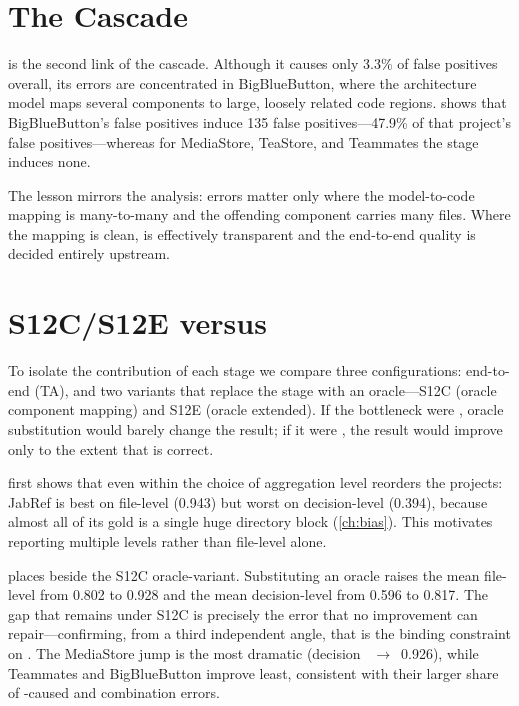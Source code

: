 \section{The \samcode Cascade}
\label{sec:transarc:samcode}

\samcode is the second link of the cascade. Although it causes only 3.3\% of
\transarc false positives overall, its errors are concentrated in
BigBlueButton, where the architecture model maps several components to large,
loosely related code regions.  shows that
BigBlueButton's \samcode false positives induce 135 \sadcode false
positives---47.9\% of that project's \transarc false positives---whereas for
MediaStore, TeaStore, and Teammates the \samcode stage induces none.



The lesson mirrors the \sadsam analysis: \samcode errors matter only where the
model-to-code mapping is many-to-many and the offending component carries many
files. Where the mapping is clean, \samcode is effectively transparent and the
end-to-end quality is decided entirely upstream.

\section{S12C/S12E versus \transarc}
\label{sec:transarc:s12c}

To isolate the contribution of each stage we compare three configurations:
end-to-end \transarc (TA), and two variants that replace the \samcode stage with
an oracle---S12C (oracle \samcode component mapping) and S12E (oracle \samcode
extended). If the bottleneck were \samcode, oracle substitution would barely
change the result; if it were \sadsam, the result would improve only to the
extent that \sadsam is correct.

 first shows that even within \transarc the choice of
aggregation level reorders the projects: JabRef is best on file-level \fone
(0.943) but worst on decision-level \fone (0.394), because almost all of its
gold is a single huge directory block (\cref{ch:bias}). This motivates reporting
multiple levels rather than file-level \fone alone.



 places \transarc beside the S12C oracle-\samcode variant.
Substituting an oracle \samcode raises the mean file-level \fone from 0.802 to
0.928 and the mean decision-level \fone from 0.596 to 0.817. The gap that
remains under S12C is precisely the \sadsam error that no \samcode improvement
can repair---confirming, from a third independent angle, that \sadsam is the
binding constraint on \transarc. The MediaStore jump is the most dramatic
(decision ~$\to$~0.926), while Teammates and BigBlueButton improve
least, consistent with their larger share of \sadsam-caused and combination
errors.

